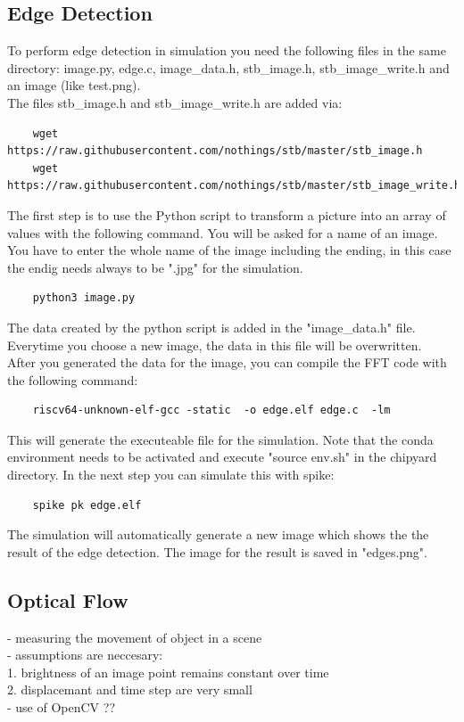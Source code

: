 \documentclass{article}
\begin{document}
{\subsection*{Edge Detection}
To perform edge detection in simulation you need the following files in the same directory: image.py, edge.c, image\_data.h, stb\_image.h, stb\_image\_write.h and an image (like test.png).\\
The files stb\_image.h and stb\_image\_write.h are added via:\\
\begin{lstlisting}
    wget https://raw.githubusercontent.com/nothings/stb/master/stb_image.h
    wget https://raw.githubusercontent.com/nothings/stb/master/stb_image_write.h
\end{lstlisting}
The first step is to use the Python script to transform a picture into an array of values with 
the following command. You will be asked for a name of an image. You have to enter the whole name of the image including the ending, in this case the endig needs always to be ".jpg" for the simulation.\\
\begin{lstlisting}
    python3 image.py
\end{lstlisting} 
The data created by the python script is added in the "image\_data.h" file. Everytime you choose a new image, the data in this file will be overwritten.\\
After you generated the data for the image, you can compile the FFT code with the following command:\\
\begin{lstlisting}
    riscv64-unknown-elf-gcc -static  -o edge.elf edge.c  -lm
\end{lstlisting}
This will generate the executeable file for the simulation. Note that the conda environment needs to be activated and execute "source env.sh" in the chipyard directory. In the next step you can simulate this with spike:\\
\begin{lstlisting}
    spike pk edge.elf
\end{lstlisting}
The simulation will automatically generate a new image which shows the the result of the edge detection. The image for the result is saved in "edges.png".
\subsection*{Optical Flow}
- measuring the movement of object in a scene\\
- assumptions are neccesary: \\
1. brightness of an image point remains constant over time\\
2. displacemant and time step are very small\\
- use of OpenCV ??
}
\end{document}
